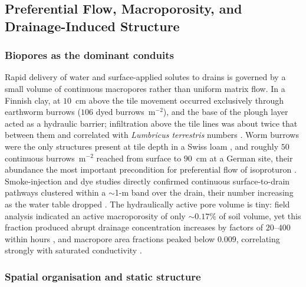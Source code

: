 \documentclass[11pt]{article}
\begin{document}
\subsection{Preferential Flow, Macroporosity, and Drainage-Induced Structure}

\subsubsection{Biopores as the dominant conduits}

Rapid delivery of water and surface-applied solutes to drains is governed by
a small volume of continuous macropores rather than uniform matrix flow. In
a Finnish clay, at $10$~cm above the tile movement occurred exclusively
through earthworm burrows ($106$ dyed burrows~m$^{-2}$), and the base of the
plough layer acted as a hydraulic barrier; infiltration above the tile lines
was about twice that between them and correlated with \textit{Lumbricus
terrestris} numbers \parencite{Shipitalo2004}. Worm burrows were the only
structures present at tile depth in a Swiss loam \parencite{Stamm2002}, and
roughly $50$ continuous burrows~m$^{-2}$ reached from surface to $90$~cm at a
German site, their abundance the most important precondition for preferential
flow of isoproturon \parencite{Zehe2001}. Smoke-injection and dye studies
directly confirmed continuous surface-to-drain pathways clustered within a
$\sim$1-m band over the drain, their number increasing as the water table
dropped \parencite{Nielsen2015,Petersen2012}. The hydraulically active pore
volume is tiny: field analysis indicated an active macroporosity of only
$\sim0.17\%$ of soil volume, yet this fraction produced abrupt drainage
concentration increases by factors of $20$--$400$ within hours
\parencite{Villholth1998}, and macropore area fractions peaked below
$0.009$, correlating strongly with saturated conductivity
\parencite{Frey2011}.

\subsubsection{Spatial organisation and static structure}
\end{document}
